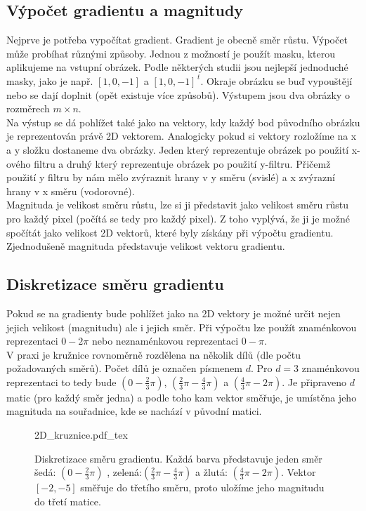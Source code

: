 \documentclass[czech,BP]{thesiskiv}
\begin{document}
\subsection{Výpočet gradientu a magnitudy}
Nejprve je potřeba vypočítat gradient. Gradient je obecně směr růstu. Výpočet může probíhat různými způsoby. Jednou z možností je použít masku, kterou aplikujeme na vstupní obrázek. Podle některých studii jsou nejlepší jednoduché masky, jako je např. $[1, 0, -1]$ a $[1, 0, -1]^{\,t}$. Okraje obrázku se buď vypouštějí nebo se dají doplnit (opět existuje více způsobů). Výstupem jsou dva obrázky o rozměrech $m \times n$. \\
Na výstup se dá pohlížet také jako na vektory, kdy každý bod původního obrázku je reprezentován právě 2D vektorem. Analogicky pokud si vektory rozložíme na x a y složku dostaneme dva obrázky. Jeden který reprezentuje obrázek po použití x-ového filtru a druhý který reprezentuje obrázek po použití y-filtru. Přičemž použití y filtru by nám mělo zvýraznit hrany v y směru (svislé) a x zvýrazní hrany v x směru (vodorovné). \\

Magnituda je velikost směru růstu, lze si ji představit jako velikost směru růstu pro každý pixel (počítá se tedy pro každý pixel).  Z toho vyplývá, že ji je možné spočítát jako velikost 2D vektorů, které byly získány při výpočtu gradientu. Zjednodušeně magnituda představuje velikost vektoru gradientu. \\

\subsection{Diskretizace směru gradientu}
Pokud se na gradienty bude pohlížet jako na 2D vektory je možné určit nejen jejich velikost (magnitudu) ale i jejich směr. Při výpočtu lze použít znaménkovou reprezentaci $0 - 2\pi$ nebo neznaménkovou reprezentaci $0 - \pi$. \\
V praxi je kružnice rovnoměrně rozdělena na několik dílů (dle počtu požadovaných směrů). Počet dílů  je označen písmenem $d$. Pro $d = 3$ znaménkovou reprezentaci to tedy bude $\left(0 - \frac{2}{3}\pi \right)$, $\left(\frac{2}{3}\pi - \frac{4}{3}\pi \right)$ a $\left(\frac{4}{3}\pi - 2\pi \right)$. Je připraveno $d$ matic (pro každý směr jedna) a podle toho kam vektor směřuje, je umístěna jeho magnituda na souřadnice, kde se nachází v původní matici. 

\begin{figure}[H]
    \centering    
    \def\svgwidth{230pt}
	{2D_kruznice.pdf_tex}    
    \caption{Diskretizace směru gradientu. Každá barva představuje jeden směr šedá: $\left(0 - \frac{2}{3}\pi \right)$ , zelená:$\left(\frac{2}{3}\pi - \frac{4}{3}\pi \right)$ a žlutá: $\left(\frac{4}{3}\pi - 2\pi \right)$. Vektor $[ -2, -5 ]$ směřuje do třetího směru, proto uložíme jeho magnitudu do třetí matice. }
    \label{fig: 2D_graf}
\end{figure}
\end{document}
